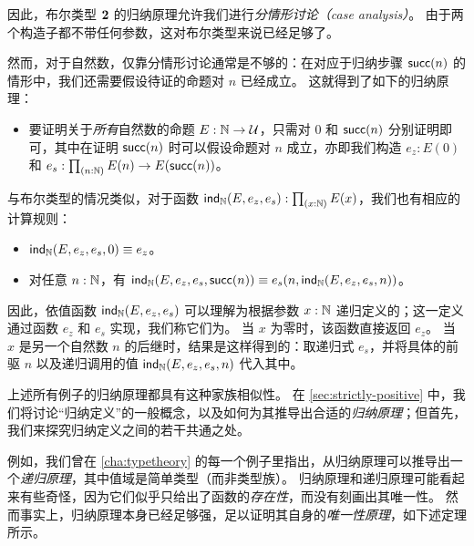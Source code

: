 %
因此，布尔类型 $\mathbf{2}$ 的归纳原理允许我们进行\emph{分情形讨论（case analysis）}。
由于两个构造子都不带任何参数，这对布尔类型来说已经足够了。

%
然而，对于自然数，仅靠分情形讨论通常是不够的：在对应于归纳步骤 $\mathsf{succ}(n)$ 的情形中，我们还需要假设待证的命题对 $n$ 已经成立。
这就得到了如下的归纳原理：

\begin{itemize}
\item 要证明关于\emph{所有}自然数的命题 $E : \mathbb{N} \to \mathcal{U}$，只需对 $0$ 和 $\mathsf{succ}(n)$ 分别证明即可，其中在证明 $\mathsf{succ}(n)$ 时可以假设命题对 $n$ 成立，亦即我们构造 $e_z : E(0)$ 和 $e_s : \prd{n : \nat} E(n) \to E(\suc(n))$。
\end{itemize}

与布尔类型的情况类似，对于函数 $\ind\nat(E,e_z,e_s) : \prd{x:\nat} E(x)$，我们也有相应的计算规则：
%

\begin{itemize}
\item $\mathsf{ind}_{\mathbb{N}}(E,e_z,e_s,0) \equiv e_z$。
\item 对任意 $n : \mathbb{N}$，有 $\mathsf{ind}_{\mathbb{N}}(E,e_z,e_s,\mathsf{succ}(n)) \equiv e_s(n,\mathsf{ind}_{\mathbb{N}}(E,e_z,e_s,n))$。
\end{itemize}

因此，依值函数 $\mathsf{ind}_{\mathbb{N}}(E,e_z,e_s)$ 可以理解为根据参数 $x : \mathbb{N}$ 递归定义的；这一定义通过函数 $e_z$ 和 $e_s$ 实现，我们称它们为。
当 $x$ 为零时，该函数直接返回 $e_z$。
当 $x$ 是另一个自然数 $n$ 的后继时，结果是这样得到的：取递归式 $e_s$，并将具体的前驱 $n$ 以及递归调用的值 $\mathsf{ind}_{\mathbb{N}}(E,e_z,e_s,n)$ 代入其中。

上述所有例子的归纳原理都具有这种家族相似性。
在 \cref{sec:strictly-positive} 中，我们将讨论“归纳定义”的一般概念，以及如何为其推导出合适的\emph{归纳原理}；但首先，我们来探究归纳定义之间的若干共通之处。

%
例如，我们曾在 \cref{cha:typetheory} 的每一个例子里指出，从归纳原理可以推导出一个\emph{递归原理}，其中值域是简单类型（而非类型族）。
归纳原理和递归原理可能看起来有些奇怪，因为它们似乎只给出了函数的\emph{存在性}，而没有刻画出其唯一性。
然而事实上，归纳原理本身已经足够强，足以证明其自身的\emph{唯一性原理}，如下述定理所示。

